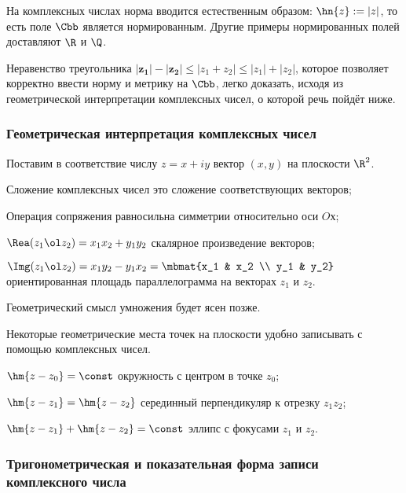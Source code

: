 \documentclass[a4paper]{article}
\begin{document}
На комплексных числах норма вводится естественным образом: $\hn{z} := |z|$, то есть поле $\Cbb$ является нормированным.
Другие примеры нормированных полей доставляют $\R$ и $\Q$.

Неравенство треугольника $\bm{|z_1|-|z_2|}\le |z_1+z_2|\le|z_1|+|z_2|$, которое позволяет корректно ввести норму
и метрику на $\Cbb$, легко доказать, исходя из геометрической интерпретации комплексных чисел, о которой
речь пойдёт ниже.

\subsubsection{Геометрическая интерпретация комплексных чисел}

Поставим в соответствие числу $z = x + iy$ вектор $(x,y)$ на плоскости $\R^2$.

\begin{items}{-2}
\item Сложение комплексных чисел это сложение соответствующих векторов;
\item Операция сопряжения равносильна симметрии относительно оси $Oх$;
\item $\Rea(z_1\ol z_2) = x_1 x_2 + y_1 y_2$ скалярное произведение векторов;
\item $\Img(z_1\ol z_2) = x_1 y_2 - y_1 x_2 = \mbmat{x_1 & x_2 \\ y_1 & y_2}$ ориентированная площадь
параллелограмма на векторах $z_1$ и $z_2$.
\end{items}

Геометрический смысл умножения будет ясен позже.

Некоторые геометрические места точек на плоскости удобно записывать с помощью комплексных чисел.

\begin{ex}
\begin{items}{-2}
\item $\hm{z - z_0} = \const$ окружность с центром в точке $z_0$;
\item $\hm{z - z_1} = \hm{z - z_2 }$ серединный перпендикуляр к отрезку $z_1z_2$;
\item $\hm{z - z_1} + \hm{z - z_2 } = \const$ эллипс с фокусами $z_1$ и $z_2$.
\end{items}
\end{ex}

\subsubsection{Тригонометрическая и показательная форма записи комплексного числа}
\end{document}
